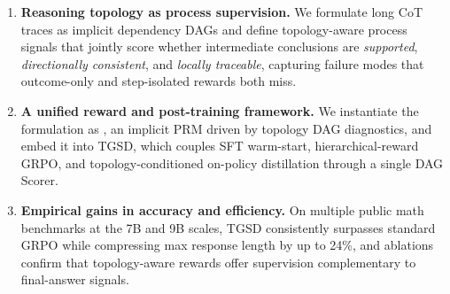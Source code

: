 \begin{enumerate}[leftmargin=*,itemsep=2pt]
\item \textbf{Reasoning topology as process supervision.} We formulate long CoT traces as implicit dependency DAGs and define topology-aware process signals that jointly score whether intermediate conclusions are \emph{supported}, \emph{directionally consistent}, and \emph{locally traceable}, capturing failure modes that outcome-only and step-isolated rewards both miss.
\item \textbf{A unified reward and post-training framework.} We instantiate the formulation as \textsc{\method}, an implicit PRM driven by topology DAG diagnostics, and embed it into \textsc{TGSD}, which couples SFT warm-start, hierarchical-reward GRPO, and topology-conditioned on-policy distillation through a single DAG Scorer.
\item \textbf{Empirical gains in accuracy and efficiency.} On multiple public math benchmarks at the 7B and 9B scales, \textsc{TGSD} consistently surpasses standard GRPO while compressing max response length by up to 24\%, and ablations confirm that topology-aware rewards offer supervision complementary to final-answer signals.
\end{enumerate}




